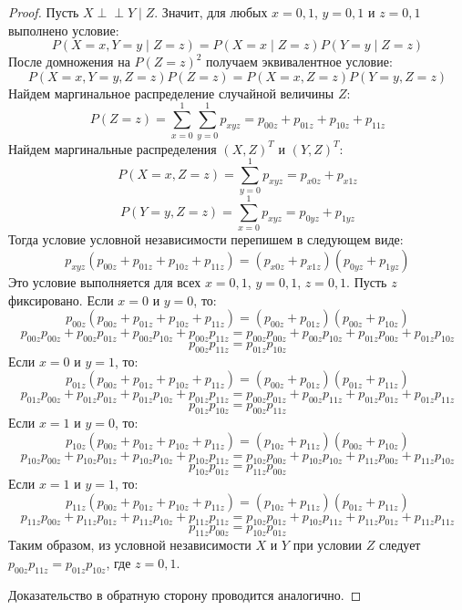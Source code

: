 \documentclass[a4paper,14pt]{extarticle}
\theoremstyle{definition}
\def\ci{\perp\!\!\!\perp}
\begin{document}
\begin{proof}
    Пусть $X \ci Y \mid Z$. Значит, для любых $x=0,1$, $y=0,1$ и $z=0,1$ выполнено условие:
    $$
        P(X=x, Y=y \mid Z = z) = P(X=x \mid Z = z) P(Y=y \mid Z = z)
    $$
    После домножения на $P(Z=z)^2$ получаем эквивалентное условие:
    $$
        P(X=x,Y=y,Z=z)P(Z=z)=P(X=x,Z=z)P(Y=y,Z=z)
    $$
    Найдем маргинальное распределение случайной величины $Z$:
    $$
        P(Z=z)=\sum_{x=0}^{1} \sum_{y=0}^{1} p_{xyz} = p_{00z} + p_{01z} + p_{10z} + p_{11z}
    $$
    Найдем маргинальные распределения $(X,Z)^T$ и $(Y,Z)^T$:
    $$
        P(X=x, Z=z) = \sum_{y=0}^{1} p_{xyz} = p_{x0z} + p_{x1z}
    $$
    $$
        P(Y=y, Z=z) = \sum_{x=0}^{1} p_{xyz} = p_{0yz} + p_{1yz}
    $$
    Тогда условие условной независимости перепишем в следующем виде:
    $$
        p_{xyz} (p_{00z} + p_{01z} + p_{10z} + p_{11z}) = (p_{x0z} + p_{x1z}) (p_{0yz} + p_{1yz})
    $$
    Это условие выполняется для всех $x=0,1$, $y=0,1$, $z=0,1$.
    Пусть $z$ фиксировано.
    Если $x=0$ и $y=0$, то:
    $$
        p_{00z} (p_{00z} + p_{01z} + p_{10z} + p_{11z}) = (p_{00z} + p_{01z}) (p_{00z} + p_{10z})
    $$
    $$
        p_{00z} p_{00z} + p_{00z} p_{01z} + p_{00z} p_{10z} + p_{00z} p_{11z} =
        p_{00z} p_{00z} + p_{00z} p_{10z} + p_{01z} p_{00z} + p_{01z} p_{10z}
    $$
    $$
        p_{00z} p_{11z} = p_{01z} p_{10z}
    $$
    Если $x=0$ и $y=1$, то:
    $$
        p_{01z} (p_{00z} + p_{01z} + p_{10z} + p_{11z}) = (p_{00z} + p_{01z}) (p_{01z} + p_{11z})
    $$
    $$
        p_{01z}p_{00z} + p_{01z}p_{01z} + p_{01z}p_{10z} + p_{01z}p_{11z} =
        p_{00z}p_{01z} + p_{00z} p_{11z} + p_{01z} p_{01z} + p_{01z} p_{11z}
    $$
    $$
        p_{01z}p_{10z}=p_{00z} p_{11z}
    $$
    Если $x=1$ и $y=0$, то:
    $$
        p_{10z} (p_{00z} + p_{01z} + p_{10z} + p_{11z}) = (p_{10z} + p_{11z}) (p_{00z} + p_{10z})
    $$
    $$
        p_{10z} p_{00z} + p_{10z} p_{01z} + p_{10z} p_{10z} + p_{10z} p_{11z} = p_{10z}p_{00z} + p_{10z}p_{10z} + p_{11z}p_{00z} + p_{11z}p_{10z}
    $$
    $$
        p_{10z} p_{01z} = p_{11z}p_{00z}
    $$
    Если $x=1$ и $y=1$, то:
    $$
        p_{11z} (p_{00z} + p_{01z} + p_{10z} + p_{11z}) = (p_{10z} + p_{11z}) (p_{01z} + p_{11z})
    $$
    $$
        p_{11z} p_{00z} + p_{11z} p_{01z} + p_{11z} p_{10z} + p_{11z} p_{11z} = p_{10z} p_{01z} + p_{10z}p_{11z} + p_{11z}p_{01z} +
        p_{11z} p_{11z}
    $$
    $$
        p_{11z} p_{00z} = p_{10z} p_{01z}
    $$
    Таким образом, из условной независимости $X$ и $Y$ при условии $Z$ следует
    $p_{00z}p_{11z}=p_{01z}p_{10z}$, где $z=0,1$.

    Доказательство в обратную сторону проводится аналогично.
\end{proof}
\end{document}
